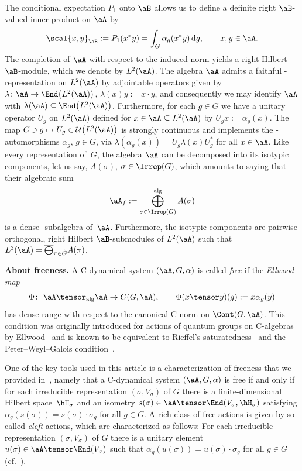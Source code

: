 The conditional expectation $P_1$ onto $\aB$ allows us to define a definite right $\aB$\nobreakdash-valued inner product on $\aA$ by
\begin{gather*}
	\scal{x,y}_\aB := P_1(x^*y) = \int_G \alpha_g(x^*y) \, {\rm d}g,
	\qquad
	x,y \in \aA.
\end{gather*}
The completion of $\aA$ with respect to the induced norm yields a right Hilbert $\aB$\nobreakdash-module, which we denote by $L^2(\aA)$.
The algebra $\aA$ admits a faithful \Star-representation on $L^2(\aA)$ by adjointable operators given by $\lambda\colon \aA \to \End \big( L^2(\aA) \big)$, $\lambda(x)y := x \cdot y$, and consequently we may identify $\aA$ with $\lambda(\aA) \subseteq \End \big( L^2(\aA) \big)$.
Furthermore, for each $g \in G$ we have a unitary operator $U_g$ on $L^2(\aA)$ defined for $x \in \aA \subseteq L^2(\aA)$ by $U_g x := \alpha_g(x)$.
The map $G \ni g \mapsto U_g \in \mathcal{U}\big( L^2(\aA) \big)$ is strongly continuous and implements the \Star-automorphisms $\alpha_g$, $g \in G$, via $\lambda ( \alpha_g(x)) = U_g \lambda(x) U_g^*$ for all $x \in \aA$.
Like every representation of~$G$, the algebra $\aA$ can be decomposed into its isotypic components, let us say, $A(\sigma)$, $\sigma \in \Irrep(G)$, which amounts to saying that their algebraic sum
\begin{gather*}
	\aA_f:= \bigoplus_{\sigma \in \Irrep(G)}^{\rm alg} A(\sigma)
\end{gather*}
is a dense \Star-subalgebra of~$\aA$.
Furthermore, the isotypic components are pairwise orthogonal, right Hilbert $\aB$-submodules of $L^2(\aA)$ such that $L^2(\aA) = \overline{\bigoplus}_{\pi \in \hat G} A(\pi)$.

{\bf About freeness.}
A C\Star-dynamical system $(\aA,G,\alpha)$ is called \emph{free} if the \emph{Ellwood map}
\begin{align*}
	\Phi\colon \ \aA \tensor_{\text{alg}} \aA \rightarrow C(G,\aA),
	\qquad
	\Phi(x\tensor y)(g):=x \alpha_g(y)
\end{align*}
has dense range with respect to the canonical C\Star-norm on $\Cont(G,\aA)$.
This condition was originally introduced for actions of quantum groups on C\Star-algebras by Ellwood~\cite{Ell00} and is known to be equivalent to Rieffel's saturatedness~\cite{Rieffel91} and the Peter--Weyl--Galois condition~\cite{BaCoHa15}.

One of the key tools used in this article is a characterization of freeness that we provided in~\cite[Lemma~3.3]{SchWa17c}, namely that a C\Star-dynamical system $(\aA,G,\alpha)$ is free if and only if for each irreducible representation $(\sigma,V_\sigma)$ of $G$ there is a finite-dimensional Hilbert space~$\hH_\sigma$ and an isometry $s(\sigma) \in \aA \tensor \End(V_\sigma,\hH_\sigma)$ satisfying $\alpha_g(s(\sigma))=s(\sigma) \cdot \sigma_g$ for all $g \in G$.
A rich class of free actions is given by so-called \emph{cleft} actions, which are characterized as follows:
For each irreducible representation $(\sigma,V_\sigma)$ of $G$ there is a unitary element \mbox{$u(\sigma) \in \aA \tensor \End(V_\sigma)$} such that $\alpha_g(u(\sigma))=u(\sigma) \cdot \sigma_g$ for all $g \in G$ (cf.~\cite[Definition~4.1]{SchWa17b}).
